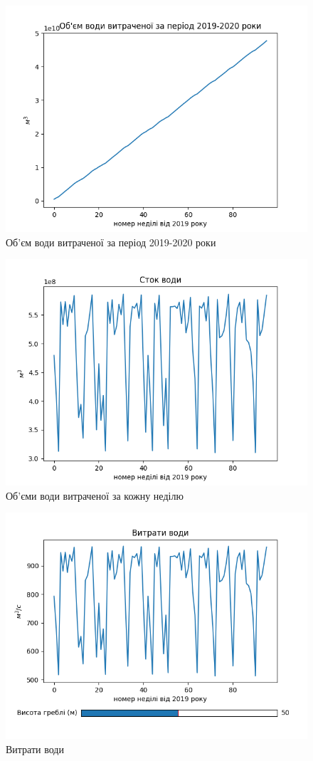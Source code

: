 \documentclass[12pt]{article}
\numberwithin{equation}{section}
\numberwithin{figure}{section}
\begin{document}
\begin{figure}[!htb]
	\centering
	\includegraphics[width=0.7\linewidth]{Figure_1.png}
	\caption{Об'єм води витраченої за період 2019-2020 роки}\label{fig:1}
\end{figure}
\begin{figure}[!htb]
	\centering
	\includegraphics[width=0.7\linewidth]{Figure_6.png}
	\caption{Об'єми води витраченої за кожну неділю}\label{fig:6}
\end{figure}
\begin{figure}[!htb]
	\centering
	\includegraphics[width=0.7\linewidth]{Figure_2.png}
	\caption{Витрати води}\label{fig:2}
\end{figure}
\end{document}
